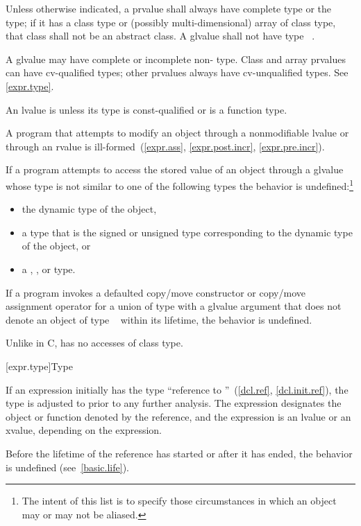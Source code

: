 \pnum
Unless otherwise indicated,
a prvalue shall always have complete type or the  type;
if it has a class type or (possibly multi-dimensional) array of class type,
that class shall not be an abstract class.
A glvalue shall not have type \cv{}~.
\begin{note}
A glvalue may have complete or incomplete non- type.
Class and array prvalues can have cv-qualified types; other prvalues
always have cv-unqualified types. See \ref{expr.type}.
\end{note}

\pnum
An lvalue is  unless its type is const-qualified
or is a function type.
\begin{note}
A program that attempts
to modify an object through a nonmodifiable lvalue or through an rvalue
is ill-formed~(\ref{expr.ass}, \ref{expr.post.incr}, \ref{expr.pre.incr}).
\end{note}

\pnum
If a program attempts to access
the stored value of an object through a glvalue
whose type is not similar to
one of the following types the behavior is
undefined:\footnote{The intent of this list is to specify those circumstances in which an
object may or may not be aliased.}
\begin{itemize}
\item the dynamic type of the object,

\item a type that is the signed or unsigned type corresponding to the
dynamic type of the object, or

\item a , , or  type.
\end{itemize}
If a program invokes
a defaulted copy/move constructor or copy/move assignment operator
for a union of type  with a glvalue argument
that does not denote an object of type \cv{}~ within its lifetime,
the behavior is undefined.
\begin{note}
Unlike in C, \Cpp{} has no accesses of class type.
\end{note}

[expr.type]{Type}

\pnum
{}%
If an expression initially has the type ``reference to
''~(\ref{dcl.ref}, \ref{dcl.init.ref}), the type is adjusted to
 prior to any further analysis. The expression designates the
object or function denoted by the reference, and the expression
is an lvalue or an xvalue, depending on the expression.
\begin{note}
Before the lifetime of the reference has started or after it has ended,
the behavior is undefined (see~\ref{basic.life}).
\end{note}

